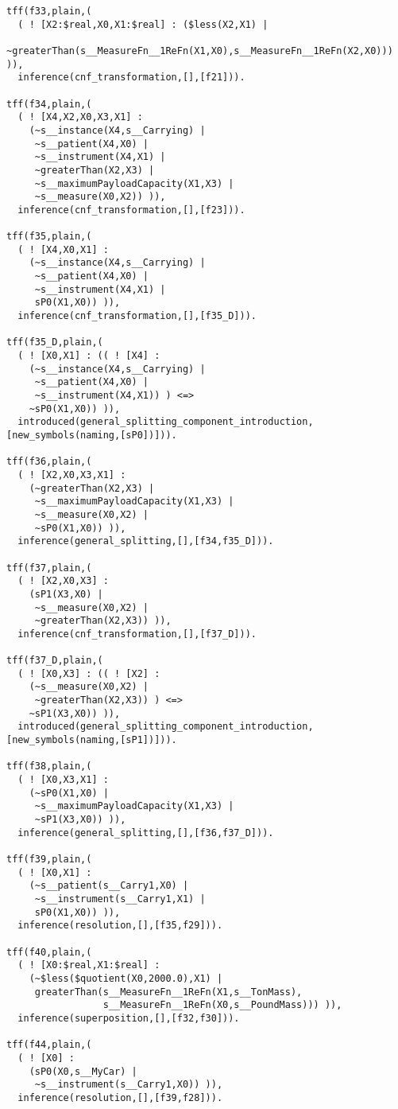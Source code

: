 \documentclass{article}
\begin{document}
\begin{verbatim}
tff(f33,plain,(
  ( ! [X2:$real,X0,X1:$real] : ($less(X2,X1) | 
    ~greaterThan(s__MeasureFn__1ReFn(X1,X0),s__MeasureFn__1ReFn(X2,X0))) )),
  inference(cnf_transformation,[],[f21])).

tff(f34,plain,(
  ( ! [X4,X2,X0,X3,X1] : 
    (~s__instance(X4,s__Carrying) | 
     ~s__patient(X4,X0) | 
     ~s__instrument(X4,X1) | 
     ~greaterThan(X2,X3) | 
     ~s__maximumPayloadCapacity(X1,X3) | 
     ~s__measure(X0,X2)) )),
  inference(cnf_transformation,[],[f23])).

tff(f35,plain,(
  ( ! [X4,X0,X1] : 
    (~s__instance(X4,s__Carrying) | 
     ~s__patient(X4,X0) |
     ~s__instrument(X4,X1) | 
     sP0(X1,X0)) )),
  inference(cnf_transformation,[],[f35_D])).

tff(f35_D,plain,(
  ( ! [X0,X1] : (( ! [X4] : 
    (~s__instance(X4,s__Carrying) | 
     ~s__patient(X4,X0) | 
     ~s__instrument(X4,X1)) ) <=> 
    ~sP0(X1,X0)) )),
  introduced(general_splitting_component_introduction,[new_symbols(naming,[sP0])])).

tff(f36,plain,(
  ( ! [X2,X0,X3,X1] : 
    (~greaterThan(X2,X3) | 
     ~s__maximumPayloadCapacity(X1,X3) | 
     ~s__measure(X0,X2) | 
     ~sP0(X1,X0)) )),
  inference(general_splitting,[],[f34,f35_D])).

tff(f37,plain,(
  ( ! [X2,X0,X3] : 
    (sP1(X3,X0) | 
     ~s__measure(X0,X2) | 
     ~greaterThan(X2,X3)) )),
  inference(cnf_transformation,[],[f37_D])).

tff(f37_D,plain,(
  ( ! [X0,X3] : (( ! [X2] : 
    (~s__measure(X0,X2) | 
     ~greaterThan(X2,X3)) ) <=> 
    ~sP1(X3,X0)) )),
  introduced(general_splitting_component_introduction,[new_symbols(naming,[sP1])])).

tff(f38,plain,(
  ( ! [X0,X3,X1] : 
    (~sP0(X1,X0) | 
     ~s__maximumPayloadCapacity(X1,X3) | 
     ~sP1(X3,X0)) )),
  inference(general_splitting,[],[f36,f37_D])).

tff(f39,plain,(
  ( ! [X0,X1] : 
    (~s__patient(s__Carry1,X0) | 
     ~s__instrument(s__Carry1,X1) | 
     sP0(X1,X0)) )),
  inference(resolution,[],[f35,f29])).

tff(f40,plain,(
  ( ! [X0:$real,X1:$real] : 
    (~$less($quotient(X0,2000.0),X1) |   
     greaterThan(s__MeasureFn__1ReFn(X1,s__TonMass),
                 s__MeasureFn__1ReFn(X0,s__PoundMass))) )),
  inference(superposition,[],[f32,f30])).

tff(f44,plain,(
  ( ! [X0] : 
    (sP0(X0,s__MyCar) | 
     ~s__instrument(s__Carry1,X0)) )),
  inference(resolution,[],[f39,f28])).


\end{verbatim}
\end{document}
